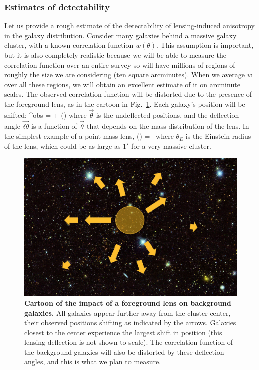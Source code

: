 \subsubsection{Estimates of detectability}

Let us provide a rough estimate of the detectability of
lensing-induced anisotropy in the galaxy distribution. Consider many
galaxies behind a massive galaxy cluster, with a known correlation
function $w(\theta)$. This assumption is important, but it is also
completely realistic because we will be able to measure the
correlation function over an entire survey so will have millions of
regions of roughly the size we are considering (ten square
arcminutes). When we average $w$ over all these regions, we will
obtain an excellent estimate of it on arcminute scales. The observed
correlation function will be distorted due to the presence of the
foreground lens, as in the cartoon in Fig.~\ref{cluster}. Each
galaxy's position will be shifted: \be \vec\theta^{\rm obs} =
\vec\theta + \vec{\delta\theta}(\vec\theta) \ee where $\vec\theta$ is
the undeflected positions, and the deflection angle $\vec
{\delta\theta}$ is a function of $\vec\theta$ that depends on the mass
distribution of the lens. In the simplest example of a point mass
lens, \be \vec{\delta\theta}(\vec\theta) =
\vec\theta\, \ee where $\theta_E$ is the
Einstein radius of the lens, which could be as large as $1'$ for a
very massive cluster.





\begin{figure}
  \begin{center}
    \includegraphics[scale=0.33]{figs/clusterfig.jpg}
  \end{center}
  \caption{
{\bf Cartoon of the impact of a foreground lens on
  background galaxies.} All galaxies appear further away from the
  cluster center, their observed positions shifting as
  indicated by the arrows. Galaxies closest to the center experience
  the largest shift in position (this 
lensing deflection is not shown to scale). The correlation function
of the background galaxies will also be distorted by these deflection
angles, and this is what we plan to measure.}
  \label{cluster}
\end{figure}

